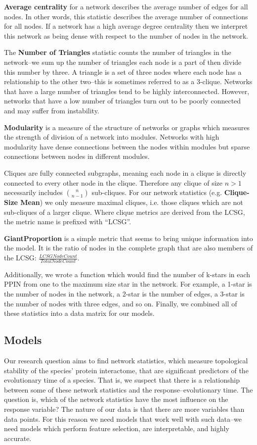 \documentclass[12pt]{article}
\begin{document}
\textbf{Average centrality} for a network describes the average number of edges for all nodes. In other words, this statistic describes the average number of connections for all nodes. If a network has a high average degree centrality then we interpret this network as being dense with respect to the number of nodes in the network.

The \textbf{Number of Triangles} statistic counts the number of triangles in the network--we sum up the number of triangles each node is a part of then divide this number by three. A triangle is a set of three nodes where each node has a relationship to the other two--this is sometimes referred to as a 3-clique. Networks that have a large number of triangles tend to be highly interconnected. However, networks that have a low number of triangles turn out to be poorly connected and may suffer from instability.

\textbf{Modularity} is a measure of the structure of networks or graphs which measures the strength of division of a network into modules. Networks with high modularity have dense connections between the nodes within modules but sparse connections between nodes in different modules.

Cliques are fully connected subgraphs, meaning each node in a clique is directly connected to every other node in the clique. Therefore any clique of size $n>1$ necessarily includes ${n \choose n-1}$ sub-cliques. For our network statistics (e.g. \textbf{Clique-Size Mean}) we only measure maximal cliques, i.e. those cliques which are not sub-cliques of a larger clique. Where clique metrics are derived from the LCSG, the metric name is prefixed with ``LCSG''.

\textbf{GiantProportion} is a simple metric that seems to bring unique information into the model. It is the ratio of nodes in the complete graph that are also members of the LCSG: $\frac{LCSG Node Count}{Total Node Count}$.

Additionally, we wrote a function which would find the number of k-stars in each PPIN from one to the maximum size star in the network. For example, a 1-star is the number of nodes in the network, a 2-star is the number of edges, a 3-star is the number of nodes with three edges, and so on. Finally, we combined all of these statistics into a data matrix for our models.

\subsection{Models}
Our research question aims to find network statistics, which measure topological stability of the species’ protein interactome, that are significant predictors of the evolutionary time of a species. That is, we suspect that there is a relationship between some of these network statistics and the response--evolutionary time. The question is, which of the network statistics have the most influence on the response variable? The nature of our data is that there are more variables than data points. For this reason we need models that work well with such data--we need models which perform feature selection, are interpretable, and highly accurate.
\end{document}
